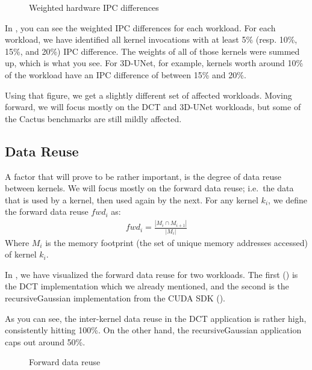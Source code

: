 \documentclass[5p,numvwe]{elsarticle}
\begin{document}
    \begin{figure}[hb]
        \centering
        \caption{Weighted hardware IPC differences}
        \label{fig:w-hw-ipc}
    \end{figure}

    In , you can see the weighted IPC differences for each workload.
    For each workload, we have identified all kernel invocations with at least 5\% (resp. 10\%, 15\%, and 20\%) IPC difference.
    The weights of all of those kernels were summed up, which is what you see.
    For 3D-UNet, for example, kernels worth around 10\% of the workload have an IPC difference of between 15\% and 20\%.

    Using that figure, we get a slightly different set of affected workloads.
    Moving forward, we will focus mostly on the DCT and 3D-UNet workloads, but some of the Cactus benchmarks are still mildly affected.

    \subsection{Data Reuse}\label{subsec:data-reuse}
    A factor that will prove to be rather important, is the degree of data reuse between kernels.
    We will focus mostly on the forward data reuse; i.e.\ the data that is used by a kernel, then used again by the next.
    For any kernel $k_i$, we define the forward data reuse $fwd_i$ as:
    \begin{align}
        fwd_i = \frac{|M_i \cap M_{i+1}|}{|M_i|}
    \end{align}
    Where $M_i$ is the memory footprint (the set of unique memory addresses accessed) of kernel $k_i$.

    In , we have visualized the forward data reuse for two workloads.
    The first () is the DCT implementation which we already mentioned, and the second is the recursiveGaussian implementation from the CUDA SDK ().

    As you can see, the inter-kernel data reuse in the DCT application is rather high, consistently hitting 100\%.
    On the other hand, the recursiveGaussian application caps out around 50\%.

    \begin{figure}[ht]
        \centering
        \caption{Forward data reuse}
        \label{fig:fwd-hw}
    \end{figure}
\end{document}
